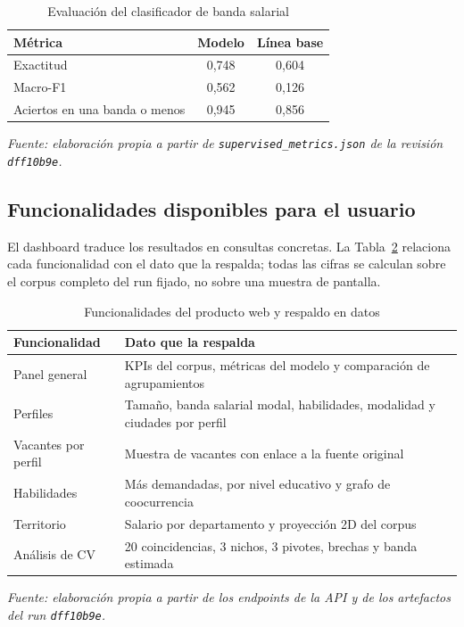 \documentclass[journal]{IEEEtran}
\begin{document}
\begin{table}[H]
\caption{Evaluación del clasificador de banda salarial}
\label{tab:modelo}
\centering
\footnotesize
\renewcommand{\arraystretch}{1.15}
\begin{tabular}{p{}cc}
\hline
\textbf{Métrica} & \textbf{Modelo} & \textbf{Línea base}\\
\hline
Exactitud & 0,748 & 0,604\\
Macro-F1 & 0,562 & 0,126\\
Aciertos en una banda o menos & 0,945 & 0,856\\
\hline
\end{tabular}

\vspace{2pt}
\textit{Fuente: elaboración propia a partir de \texttt{supervised\_metrics.json} de la revisión \texttt{dff10b9e}.}
\end{table}

\subsection{Funcionalidades disponibles para el usuario}
El dashboard traduce los resultados en consultas concretas. La Tabla~\ref{tab:web} relaciona cada funcionalidad con el dato que la respalda; todas las cifras se calculan sobre el corpus completo del run fijado, no sobre una muestra de pantalla.

\begin{table}[H]
\caption{Funcionalidades del producto web y respaldo en datos}
\label{tab:web}
\centering
\footnotesize
\renewcommand{\arraystretch}{1.15}
\begin{tabular}{p{}p{}}
\hline
\textbf{Funcionalidad} & \textbf{Dato que la respalda}\\
\hline
Panel general & KPIs del corpus, métricas del modelo y comparación de agrupamientos\\
Perfiles & Tamaño, banda salarial modal, habilidades, modalidad y ciudades por perfil\\
Vacantes por perfil & Muestra de vacantes con enlace a la fuente original\\
Habilidades & Más demandadas, por nivel educativo y grafo de coocurrencia\\
Territorio & Salario por departamento y proyección 2D del corpus\\
Análisis de CV & 20 coincidencias, 3 nichos, 3 pivotes, brechas y banda estimada\\
\hline
\end{tabular}

\vspace{2pt}
\textit{Fuente: elaboración propia a partir de los endpoints de la API y de los artefactos del run \texttt{dff10b9e}.}
\end{table}
\end{document}
